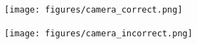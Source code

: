 \begin{center}
  \label{fig:camera-correct}
  \centering
  \texttt{[image: figures/camera\_correct.png]}
\end{center}

\begin{center}
  \label{fig:camera-incorrect}
  \centering
  \texttt{[image: figures/camera\_incorrect.png]}
\end{center}